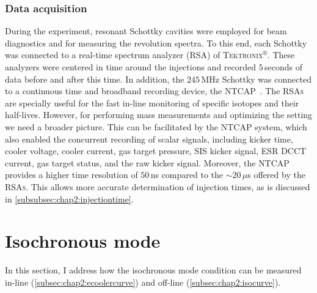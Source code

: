 \subsubsection{Data acquisition}\label{subsubsec:chap2:dataacquisiton}
During the experiment, resonant Schottky cavities were employed for beam diagnostics and for measuring the revolution spectra. To this end, each Schottky was connected to a real-time spectrum analyzer (\textsc{RSA}) of \textsc{Tektronix}$^{\circledR}$. These analyzers were centered in time around the injections and recorded $5$\,seconds of data before and after this time. In addition, the $245$\,MHz Schottky was connected to a continuous time and broadband recording device, the \textsc{NTCAP}~\cite{NTCAPpaper, NTCAPphd}.
\newpar
The \textsc{RSAs} are specially useful for the fast in-line monitoring of specific isotopes and their half-lives. However, for performing mass measurements and optimizing the setting we need a broader picture. This can be facilitated by the \textsc{NTCAP} system, which also enabled the concurrent recording of scalar signals, including kicker time, cooler voltage, cooler current, gas target pressure, \textsc{SIS} kicker signal, \textsc{ESR} \textsc{DCCT} current, gas target status, and the raw kicker signal.
Moreover, the \textsc{NTCAP} provides a higher time resolution of $50$\,ns compared  to the $\sim 20\,\mu$s offered by the \textsc{RSAs}. This allows more accurate determination of injection times, as is discussed in \cref{subsubsec:chap2:injectiontime}.

\section{Isochronous mode}\label{sec:chap2:isomode}
In this section, I address how the isochronous mode condition can be measured in-line (\cref{subsec:chap2:ecoolercurve}) and off-line (\cref{subsec:chap2:isocurve}).

